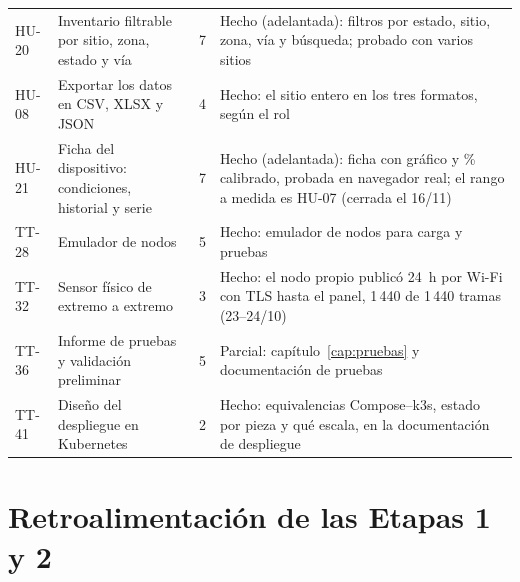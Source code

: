 \begin{longtable}{@{}L{1.2cm}L{4.6cm}C{0.6cm}L{5.4cm}@{}}
HU-20 & Inventario filtrable por sitio, zona, estado y vía & 7 & Hecho (adelantada): filtros por estado, sitio, zona, vía y búsqueda; probado con varios sitios \\
HU-08 & Exportar los datos en CSV, XLSX y JSON & 4 & Hecho: el sitio entero en los tres formatos, según el rol \\
HU-21 & Ficha del dispositivo: condiciones, historial y serie & 7 & Hecho (adelantada): ficha con gráfico y \% calibrado, probada en navegador real; el rango a medida es HU-07 (cerrada el 16/11) \\
TT-28 & Emulador de nodos & 5 & Hecho: emulador de nodos para carga y pruebas \\
TT-32 & Sensor físico de extremo a extremo & 3 & Hecho: el nodo propio publicó 24~h por Wi-Fi con TLS hasta el panel, 1\,440 de 1\,440 tramas (23--24/10) \\
TT-36 & Informe de pruebas y validación preliminar & 5 & Parcial: capítulo~\ref{cap:pruebas} y documentación de pruebas \\
TT-41 & Diseño del despliegue en Kubernetes & 2 & Hecho: equivalencias Compose--k3s, estado por pieza y qué escala, en la documentación de despliegue \\
\end{longtable}

\section*{Retroalimentación de las Etapas 1 y 2}

